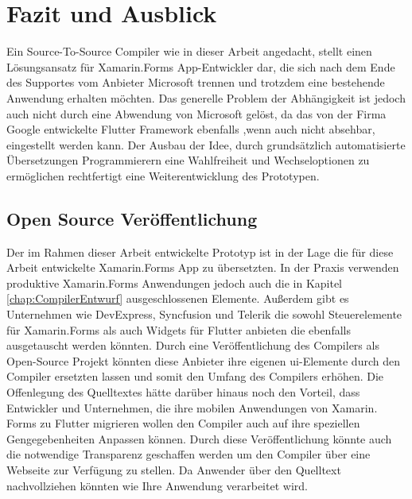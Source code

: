 \chapter{Fazit und Ausblick}
\label{chap:FazitAusblick}
Ein Source-To-Source Compiler wie in dieser Arbeit angedacht, stellt einen Lösungsansatz für Xamarin.Forms App-Entwickler dar,  die sich nach dem Ende des Supportes vom Anbieter Microsoft trennen und trotzdem eine bestehende Anwendung erhalten möchten.  Das generelle Problem der Abhängigkeit ist jedoch auch nicht durch eine Abwendung von Microsoft gelöst, da das von der Firma Google entwickelte Flutter Framework ebenfalls ,wenn auch nicht absehbar,  eingestellt werden kann. Der Ausbau der Idee,  durch grundsätzlich automatisierte Übersetzungen Programmierern eine Wahlfreiheit und Wechseloptionen zu ermöglichen rechtfertigt eine Weiterentwicklung des Prototypen.

\section{Open Source Veröffentlichung}
Der im Rahmen dieser Arbeit entwickelte Prototyp ist in der Lage die für diese Arbeit entwickelte Xamarin.Forms App zu übersetzten.  In der Praxis verwenden produktive Xamarin.Forms Anwendungen jedoch auch die in Kapitel \ref{chap:CompilerEntwurf} ausgeschlossenen Elemente.  Außerdem gibt es Unternehmen wie DevExpress, Syncfusion und Telerik die sowohl Steuerelemente für Xamarin.Forms als auch Widgets für Flutter anbieten die ebenfalls ausgetauscht werden könnten.  Durch eine Veröffentlichung des Compilers als Open-Source Projekt könnten diese Anbieter ihre eigenen \ac{ui}-Elemente durch den Compiler ersetzten lassen und somit den Umfang des Compilers erhöhen.  Die Offenlegung des Quelltextes hätte darüber hinaus noch den Vorteil, dass Entwickler und Unternehmen, die ihre mobilen Anwendungen von Xamarin. Forms zu Flutter migrieren wollen den Compiler auch auf ihre speziellen Gengegebenheiten Anpassen können. 
Durch diese Veröffentlichung könnte auch die notwendige Transparenz geschaffen werden um den Compiler über eine Webseite zur Verfügung zu stellen.  Da Anwender über den Quelltext nachvollziehen könnten wie Ihre Anwendung verarbeitet wird.  

